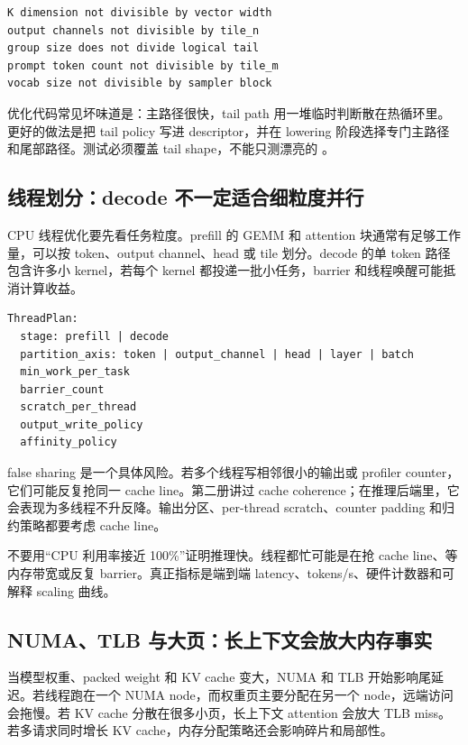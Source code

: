 \begin{lstlisting}[numbers=none,caption={tail path 需要覆盖的情况}]
K dimension not divisible by vector width
output channels not divisible by tile_n
group size does not divide logical tail
prompt token count not divisible by tile_m
vocab size not divisible by sampler block
\end{lstlisting}

优化代码常见坏味道是：主路径很快，tail path 用一堆临时判断散在热循环里。更好的做法是把 tail policy 写进 descriptor，并在 lowering 阶段选择专门主路径和尾部路径。测试必须覆盖 tail shape，不能只测漂亮的 。

\subsection{线程划分：decode 不一定适合细粒度并行}

CPU 线程优化要先看任务粒度。prefill 的 GEMM 和 attention 块通常有足够工作量，可以按 token、output channel、head 或 tile 划分。decode 的单 token 路径包含许多小 kernel，若每个 kernel 都投递一批小任务，barrier 和线程唤醒可能抵消计算收益。

\begin{lstlisting}[numbers=none,caption={线程调度要记录的字段}]
ThreadPlan:
  stage: prefill | decode
  partition_axis: token | output_channel | head | layer | batch
  min_work_per_task
  barrier_count
  scratch_per_thread
  output_write_policy
  affinity_policy
\end{lstlisting}

false sharing 是一个具体风险。若多个线程写相邻很小的输出或 profiler counter，它们可能反复抢同一 cache line。第二册讲过 cache coherence；在推理后端里，它会表现为多线程不升反降。输出分区、per-thread scratch、counter padding 和归约策略都要考虑 cache line。

\begin{warningbox}
不要用“CPU 利用率接近 100\%”证明推理快。线程都忙可能是在抢 cache line、等内存带宽或反复 barrier。真正指标是端到端 latency、tokens/s、硬件计数器和可解释 scaling 曲线。
\end{warningbox}

\subsection{NUMA、TLB 与大页：长上下文会放大内存事实}

当模型权重、packed weight 和 KV cache 变大，NUMA 和 TLB 开始影响尾延迟。若线程跑在一个 NUMA node，而权重页主要分配在另一个 node，远端访问会拖慢。若 KV cache 分散在很多小页，长上下文 attention 会放大 TLB miss。若多请求同时增长 KV cache，内存分配策略还会影响碎片和局部性。

